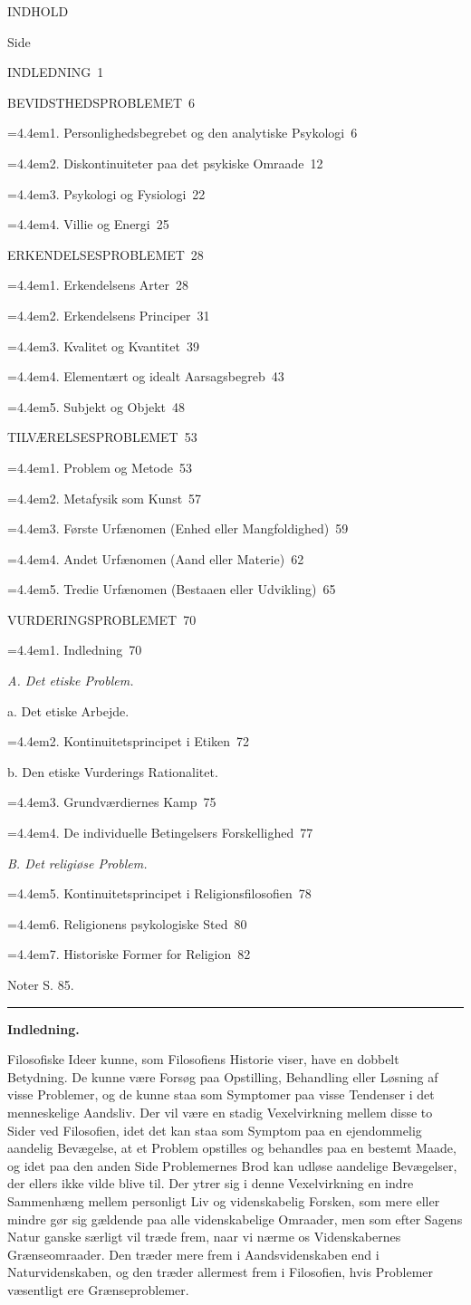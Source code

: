 \documentclass[12pt,a4paper,openany]{book}
\newcommand{\opage}[1]{\marginnote{\footnotesize\textit{[#1]}}}
\newcommand{\tocline}[3]{\noindent\makebox[2.2em][l]{#1}#2\dotfill\ #3\par}
\newcommand{\tocsub}[2]{\noindent\hangindent=4.4em\hspace*{2.2em}#1\dotfill\ #2\par}
\newcommand{\tocplain}[1]{\noindent\hspace*{2.2em}#1\par}
\begin{document}
\begin{center}{\large INDHOLD}\end{center}
\begin{flushright}{\scriptsize Side}\end{flushright}
\tocline{}{INDLEDNING}{1}
\tocline{I.}{BEVIDSTHEDSPROBLEMET}{6}
\tocsub{1. Personlighedsbegrebet og den analytiske Psykologi}{6}
\tocsub{2. Diskontinuiteter paa det psykiske Omraade}{12}
\tocsub{3. Psykologi og Fysiologi}{22}
\tocsub{4. Villie og Energi}{25}
\tocline{II.}{ERKENDELSESPROBLEMET}{28}
\tocsub{1. Erkendelsens Arter}{28}
\tocsub{2. Erkendelsens Principer}{31}
\tocsub{3. Kvalitet og Kvantitet}{39}
\tocsub{4. Elementært og idealt Aarsagsbegreb}{43}
\tocsub{5. Subjekt og Objekt}{48}
\tocline{III.}{TILVÆRELSESPROBLEMET}{53}
\tocsub{1. Problem og Metode}{53}
\tocsub{2. Metafysik som Kunst}{57}
\tocsub{3. Første Urfænomen (Enhed eller Mangfoldighed)}{59}
\tocsub{4. Andet Urfænomen (Aand eller Materie)}{62}
\tocsub{5. Tredie Urfænomen (Bestaaen eller Udvikling)}{65}
\tocline{IV.}{VURDERINGSPROBLEMET}{70}
\tocsub{1. Indledning}{70}
\tocplain{\hspace*{1em}\textit{A. Det etiske Problem.}}
\tocplain{\hspace*{3em}a. Det etiske Arbejde.}
\tocsub{2. Kontinuitetsprincipet i Etiken}{72}
\tocplain{\hspace*{3em}b. Den etiske Vurderings Rationalitet.}
\tocsub{3. Grundværdiernes Kamp}{75}
\tocsub{4. De individuelle Betingelsers Forskellighed}{77}
\tocplain{\hspace*{1em}\textit{B. Det religiøse Problem.}}
\tocsub{5. Kontinuitetsprincipet i Religionsfilosofien}{78}
\tocsub{6. Religionens psykologiske Sted}{80}
\tocsub{7. Historiske Former for Religion}{82}

\medskip
\noindent Noter S. 85.
\begin{center}\rule{2cm}{0.4pt}\end{center}
\clearpage

\opage{1}

\begin{center}\textbf{\large Indledning.}\end{center}

Filosofiske Ideer kunne, som Filosofiens Historie viser, have en dobbelt
Betydning. De kunne være Forsøg paa Opstilling, Behandling eller Løsning af
visse Problemer, og de kunne staa som Symptomer paa visse Tendenser i det
menneskelige Aandsliv. Der vil være en stadig Vexelvirkning mellem disse to
Sider ved Filosofien, idet det kan staa som Symptom paa en ejendommelig
aandelig Bevægelse, at et Problem opstilles og behandles paa en bestemt Maade,
og idet paa den anden Side Problemernes Brod kan udløse aandelige Bevægelser,
der ellers ikke vilde blive til. Der ytrer sig i denne Vexelvirkning en indre
Sammenhæng mellem personligt Liv og videnskabelig Forsken, som mere eller
mindre gør sig gældende paa alle videnskabelige Omraader, men som efter Sagens
Natur ganske særligt vil træde frem, naar vi nærme os Videnskabernes
Grænseomraader. Den træder mere frem i Aandsvidenskaben end i Naturvidenskaben,
og den træder allermest frem i Filosofien, hvis Problemer væsentligt ere
Grænseproblemer.
\end{document}
